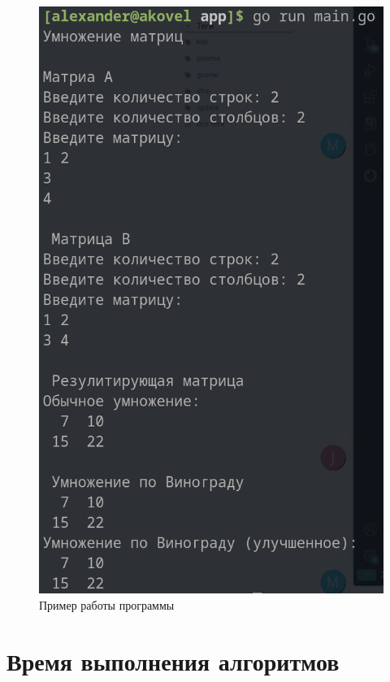 \begin{figure}[ht!]
	\begin{center}
		\captionsetup{singlelinecheck = false, justification=centerfirst}
		\includegraphics[scale=0.8]{assets/demonstration.png}
		\caption{Пример работы программы}
		\label{demonstration}
	\end{center}
	
	
\end{figure}

\newpage

\section{Время выполнения алгоритмов}

